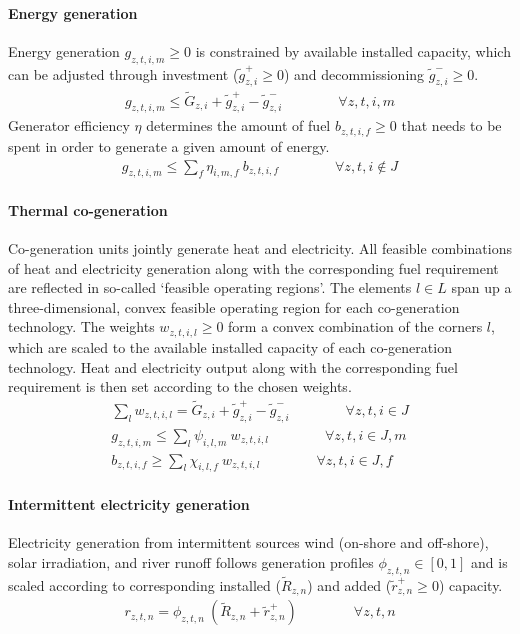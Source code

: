 \documentclass[11pt,a4paper]{article}
\begin{document}
\paragraph{Energy generation}
Energy generation $g_{z,t,i,m} \geq 0$ is constrained by available installed capacity, which can be adjusted through investment ($\widetilde{g}^{+}_{z,i} \geq 0$) and decommissioning $\widetilde{g}^{-}_{z,i} \geq 0$.
\begin{align}
g_{z,t,i,m} \leq \widetilde{G}_{z,i} + \widetilde{g}^{+}_{z,i} - \widetilde{g}^{-}_{z,i} \qquad \qquad \forall z,t,i,m
\end{align}
Generator efficiency $\eta$ determines the amount of fuel $b_{z,t,i,f} \geq 0$ that needs to be spent in order to generate a given amount of energy.
\begin{align}
g_{z,t,i,m} \leq \sum_{f} \eta_{i,m,f} \: b_{z,t,i,f} \qquad \qquad \forall z,t,i \notin J
\end{align}

\paragraph{Thermal co-generation}
Co-generation units jointly generate heat and electricity. All feasible combinations of heat and electricity generation along with the corresponding fuel requirement are reflected in so-called `feasible operating regions'. 
The elements $l \in L$ span up a three-dimensional, convex feasible operating region for each co-generation technology. 
The weights $w_{z,t,i,l} \geq 0$ form a convex combination of the corners $l$, which are scaled to the available installed capacity of each co-generation technology.
Heat and electricity output along with the corresponding fuel requirement is then set according to the chosen weights.
\begin{align}
\sum_{l} w_{z,t,i,l} = \widetilde{G}_{z,i} + \widetilde{g}^{+}_{z,i} - \widetilde{g}^{-}_{z,i} \qquad \qquad \forall z,t,i \in J \\
g_{z,t,i,m} \leq \sum_{l} \psi_{i,l,m} \: w_{z,t,i,l} \qquad \qquad \forall z,t,i \in J, m \\
b_{z,t,i,f} \geq \sum_{l} \chi_{i,l,f} \: w_{z,t,i,l} \qquad \qquad \forall z,t,i \in J, f
\end{align}

\paragraph{Intermittent electricity generation}
Electricity generation from intermittent sources wind (on-shore and off-shore), solar irradiation, and river runoff follows generation profiles $\phi_{z,t,n} \in [0,1]$ and is scaled according to corresponding installed ($ \widetilde{R}_{z,n}$) and added ($\widetilde{r}^{+}_{z,n} \geq 0$) capacity.
\begin{align}
r_{z,t,n} = \phi_{z,t,n} \: \left( \widetilde{R}_{z,n} + \widetilde{r}^{+}_{z,n} \right) \qquad \qquad \forall z,t,n
\end{align}
\end{document}

